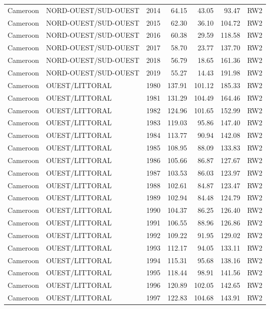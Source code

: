 \begin{longtable}{lllrrrl}
  Cameroon & NORD-OUEST/SUD-OUEST & 2014 & 64.15 & 43.05 & 93.47 & RW2 \\ 
  Cameroon & NORD-OUEST/SUD-OUEST & 2015 & 62.30 & 36.10 & 104.72 & RW2 \\ 
  Cameroon & NORD-OUEST/SUD-OUEST & 2016 & 60.38 & 29.59 & 118.58 & RW2 \\ 
  Cameroon & NORD-OUEST/SUD-OUEST & 2017 & 58.70 & 23.77 & 137.70 & RW2 \\ 
  Cameroon & NORD-OUEST/SUD-OUEST & 2018 & 56.79 & 18.65 & 161.36 & RW2 \\ 
  Cameroon & NORD-OUEST/SUD-OUEST & 2019 & 55.27 & 14.43 & 191.98 & RW2 \\ 
  Cameroon & OUEST/LITTORAL & 1980 & 137.91 & 101.12 & 185.33 & RW2 \\ 
  Cameroon & OUEST/LITTORAL & 1981 & 131.29 & 104.49 & 164.46 & RW2 \\ 
  Cameroon & OUEST/LITTORAL & 1982 & 124.96 & 101.65 & 152.99 & RW2 \\ 
  Cameroon & OUEST/LITTORAL & 1983 & 119.03 & 95.86 & 147.40 & RW2 \\ 
  Cameroon & OUEST/LITTORAL & 1984 & 113.77 & 90.94 & 142.08 & RW2 \\ 
  Cameroon & OUEST/LITTORAL & 1985 & 108.95 & 88.09 & 133.83 & RW2 \\ 
  Cameroon & OUEST/LITTORAL & 1986 & 105.66 & 86.87 & 127.67 & RW2 \\ 
  Cameroon & OUEST/LITTORAL & 1987 & 103.53 & 86.03 & 123.97 & RW2 \\ 
  Cameroon & OUEST/LITTORAL & 1988 & 102.61 & 84.87 & 123.47 & RW2 \\ 
  Cameroon & OUEST/LITTORAL & 1989 & 102.94 & 84.48 & 124.79 & RW2 \\ 
  Cameroon & OUEST/LITTORAL & 1990 & 104.37 & 86.25 & 126.40 & RW2 \\ 
  Cameroon & OUEST/LITTORAL & 1991 & 106.55 & 88.96 & 126.86 & RW2 \\ 
  Cameroon & OUEST/LITTORAL & 1992 & 109.22 & 91.95 & 129.02 & RW2 \\ 
  Cameroon & OUEST/LITTORAL & 1993 & 112.17 & 94.05 & 133.11 & RW2 \\ 
  Cameroon & OUEST/LITTORAL & 1994 & 115.31 & 95.68 & 138.16 & RW2 \\ 
  Cameroon & OUEST/LITTORAL & 1995 & 118.44 & 98.91 & 141.56 & RW2 \\ 
  Cameroon & OUEST/LITTORAL & 1996 & 120.89 & 102.05 & 142.65 & RW2 \\ 
  Cameroon & OUEST/LITTORAL & 1997 & 122.83 & 104.68 & 143.91 & RW2 \\ 

\end{longtable}
